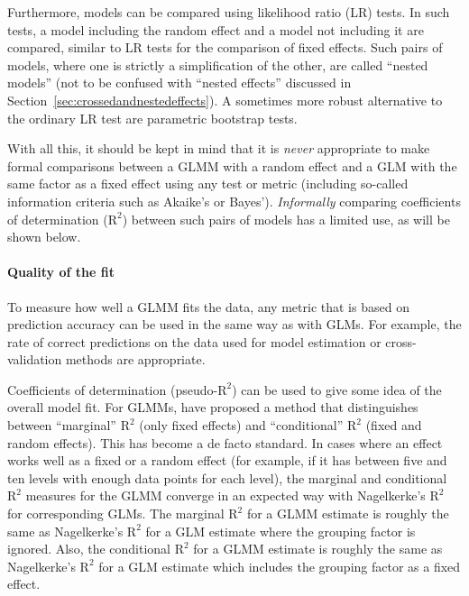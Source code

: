 Furthermore, models can be compared using likelihood ratio (LR) tests.
In such tests, a model including the random effect and a model not including it are compared, similar to LR tests for the comparison of fixed effects.
Such pairs of models, where one is strictly a simplification of the other, are called ``nested models'' (not to be confused with ``nested effects'' discussed in Section~\ref{sec:crossedandnestedeffects}).
A sometimes more robust alternative to the ordinary LR test are parametric bootstrap tests. 

With all this, it should be kept in mind that it is \textit{never} appropriate to make formal comparisons between a GLMM with a random effect and a GLM with the same factor as a fixed effect using any test or metric (including so-called information criteria such as Akaike's or Bayes').
\textit{Informally} comparing coefficients of determination ($\textrm{R}^{\textrm{2}}$) between such pairs of models has a limited use, as will be shown below.

\paragraph{Quality of the fit}

To measure how well a GLMM fits the data, any metric that is based on prediction accuracy can be used in the same way as with GLMs.
For example, the rate of correct predictions on the data used for model estimation or cross-validation methods are appropriate.

Coefficients of determination (pseudo-$\textrm{R}^{\textrm{2}}$) can be used to give some idea of the overall model fit.
For GLMMs, \citet{NakagawaSchielzeth2013} have proposed a method that distinguishes between ``marginal'' $\textrm{R}^{\textrm{2}}$ (only fixed effects) and ``conditional'' $\textrm{R}^{\textrm{2}}$ (fixed and random effects).
This has become a de facto standard.
In cases where an effect works well as a fixed or a random effect (for example, if it has between five and ten levels with enough data points for each level), the marginal and conditional $\textrm{R}^{\textrm{2}}$ measures for the GLMM converge in an expected way with Nagelkerke's $\textrm{R}^{\textrm{2}}$ for corresponding GLMs.
The marginal $\textrm{R}^{\textrm{2}}$ for a GLMM estimate is roughly the same as Nagelkerke's $\textrm{R}^{\textrm{2}}$ for a GLM estimate where the grouping factor is ignored.
Also, the conditional $\textrm{R}^{\textrm{2}}$ for a GLMM estimate is roughly the same as Nagelkerke's $\textrm{R}^{\textrm{2}}$ for a GLM estimate which includes the grouping factor as a fixed effect.


